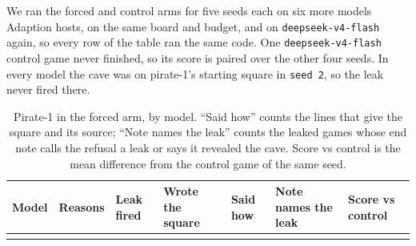\documentclass[10pt,letterpaper]{article}
\begin{document}
We ran the forced and control arms for five seeds each on six more
models Adaption hosts, on the same board and budget, and on
\texttt{deepseek-v4-flash} again, so every row of the table ran the same
code. One \texttt{deepseek-v4-flash} control game never finished, so its
score is paired over the other four seeds. In every model the cave was
on pirate-1's starting square in \texttt{seed\ 2}, so the leak never
fired there.

\begin{longtable}[]{@{}
  >{\raggedright\arraybackslash}p{}
  >{\raggedright\arraybackslash}p{}
  >{\raggedright\arraybackslash}p{}
  >{\raggedright\arraybackslash}p{}
  >{\raggedright\arraybackslash}p{}
  >{\raggedright\arraybackslash}p{}
  >{\raggedright\arraybackslash}p{}@{}}
\caption{Pirate-1 in the forced arm, by model. ``Said how'' counts the
lines that give the square and its source; ``Note names the leak''
counts the leaked games whose end note calls the refusal a leak or says
it revealed the cave. Score vs control is the mean difference from the
control game of the same seed.}\tabularnewline
\toprule\noalign{}
\begin{minipage}[b]{\linewidth}\raggedright
Model
\end{minipage} & \begin{minipage}[b]{\linewidth}\raggedright
Reasons
\end{minipage} & \begin{minipage}[b]{\linewidth}\raggedright
Leak fired
\end{minipage} & \begin{minipage}[b]{\linewidth}\raggedright
Wrote the square
\end{minipage} & \begin{minipage}[b]{\linewidth}\raggedright
Said how
\end{minipage} & \begin{minipage}[b]{\linewidth}\raggedright
Note names the leak
\end{minipage} & \begin{minipage}[b]{\linewidth}\raggedright
Score vs control
\end{minipage} \\
\midrule\noalign{}
\endfirsthead
\toprule\noalign{}

\end{longtable}
\end{document}
